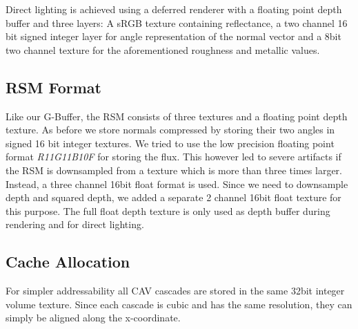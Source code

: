 \documentclass[thesis.tex]{subfiles}
\begin{document}
Direct lighting is achieved using a deferred renderer with a floating point depth buffer and three layers:
A sRGB texture containing reflectance, a two channel 16\,bit signed integer layer for angle representation of the normal vector and a 8bit two channel texture for the aforementioned roughness and metallic values.

\subsection{RSM Format}
Like our G-Buffer, the RSM consists of three textures and a floating point depth texture.
As before we store normals compressed by storing their two angles in signed 16 bit integer textures.
We tried to use the low precision floating point format \emph{R11G11B10F} for storing the flux.
This however led to severe artifacts if the RSM is downsampled from a texture which is more than three times larger.
Instead, a three channel 16bit float format is used.
Since we need to downsample depth and squared depth, we added a separate 2 channel 16bit float texture for this purpose.
The full float depth texture is only used as depth buffer during rendering and for direct lighting.

\subsection{Cache Allocation} \label{sec:impl:cachealloc}
For simpler addressability all CAV cascades are stored in the same 32bit integer volume texture.
Since each cascade is cubic and has the same resolution, they can simply be aligned along the x-coordinate.
\end{document}
